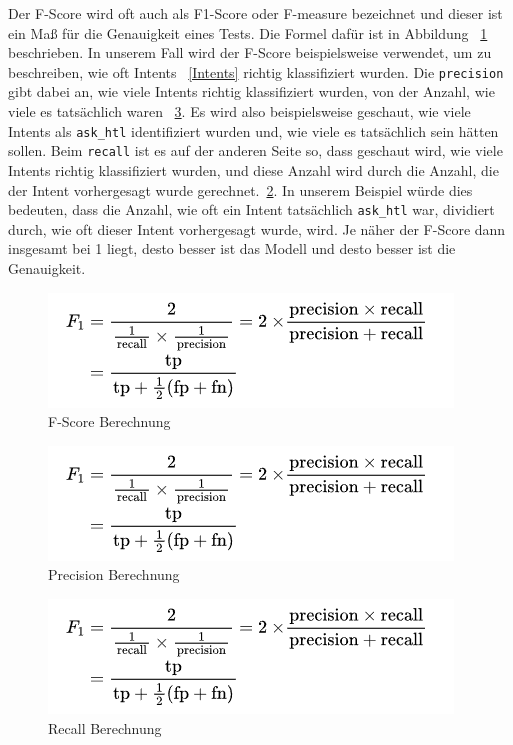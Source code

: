 Der F-Score wird oft auch als F1-Score oder F-measure bezeichnet und dieser ist ein Maß für die Genauigkeit eines Tests.
Die Formel dafür ist in Abbildung ~\ref{fig:f-score} beschrieben.
In unserem Fall wird der F-Score beispielsweise verwendet, um zu beschreiben, wie oft Intents ~\ref{Intents} richtig klassifiziert wurden.
Die \texttt{precision} gibt dabei an, wie viele Intents richtig klassifiziert wurden, von der Anzahl, wie viele es tatsächlich waren ~\ref{fig:precision}.
Es wird also beispielsweise geschaut, wie viele Intents als \texttt{ask\_htl} identifiziert wurden und, wie viele es tatsächlich sein hätten sollen.
Beim \texttt{recall} ist es auf der anderen Seite so, dass geschaut wird, wie viele Intents richtig klassifiziert wurden, und diese Anzahl wird durch die Anzahl, die der Intent vorhergesagt wurde gerechnet.~\ref{fig:recall}.
In unserem Beispiel würde dies bedeuten, dass die Anzahl, wie oft ein Intent tatsächlich \texttt{ask\_htl} war, dividiert durch, wie oft dieser Intent vorhergesagt wurde, wird.
Je näher der F-Score dann insgesamt bei 1 liegt, desto besser ist das Modell und desto besser ist die Genauigkeit.\cite{fScore}

\begin{figure}[hbt!]
    \centering
    \includegraphics[scale=0.75]{pics/f-score}
    \caption{F-Score Berechnung~\cite{fScore}}
    \label{fig:f-score}
\end{figure}

\begin{figure}[hbt!]
    \centering
    \includegraphics[scale=0.75]{pics/f-score}
    \caption{Precision Berechnung~\cite{precisionRecall}}
    \label{fig:recall}
\end{figure}

\begin{figure}[hbt!]
    \centering
    \includegraphics[scale=0.75]{pics/f-score}
    \caption{Recall Berechnung~\cite{precisionRecall}}
    \label{fig:precision}
\end{figure}

